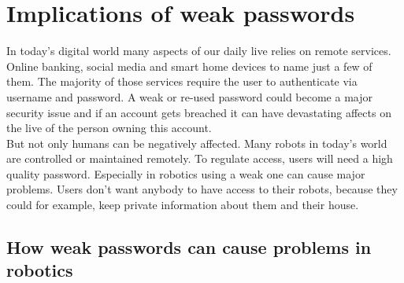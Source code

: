 \documentclass[conference]{IEEEtran}
\begin{document}
\section{Implications of weak passwords}
In today's digital world many aspects of our daily live relies on remote services. Online banking, social media and smart home devices to name just a few of them. The majority of those services require the user to authenticate via username and password. A weak or re-used password could become a major security issue and if an account gets breached it can have devastating affects on the live of the person owning this account.\\   
But not only humans can be negatively affected. Many robots in today's world are controlled or maintained remotely. To regulate access, users will need a high quality password. Especially in robotics using a weak one can cause major problems. Users don't want anybody to have access to their robots, because they could for example, keep private information about them and their house.

\subsection{How weak passwords can cause problems in robotics}
\end{document}
